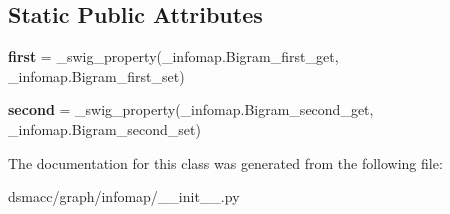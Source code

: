 \subsection*{Static Public Attributes}
\begin{DoxyCompactItemize}
\item 
\mbox{\label{classdsmacc_1_1graph_1_1infomap_1_1Bigram_a3fd048e83642c1fbab9bdd6a47b5b0a0}} 
{\bfseries first} = \+\_\+swig\+\_\+property(\+\_\+infomap.\+Bigram\+\_\+first\+\_\+get, \+\_\+infomap.\+Bigram\+\_\+first\+\_\+set)
\item 
\mbox{\label{classdsmacc_1_1graph_1_1infomap_1_1Bigram_aff859f9ced22d97536e88f90460801dc}} 
{\bfseries second} = \+\_\+swig\+\_\+property(\+\_\+infomap.\+Bigram\+\_\+second\+\_\+get, \+\_\+infomap.\+Bigram\+\_\+second\+\_\+set)
\end{DoxyCompactItemize}


The documentation for this class was generated from the following file\+:\begin{DoxyCompactItemize}
\item 
dsmacc/graph/infomap/\+\_\+\+\_\+init\+\_\+\+\_\+.\+py\end{DoxyCompactItemize}
